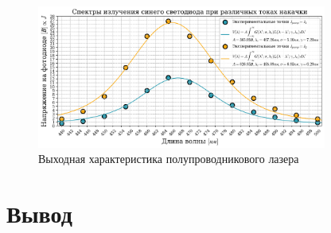 \documentclass[a4paper, 12pt]{extarticle}
\begin{document}
\begin{figure}[htbp]
    \centering
    \includegraphics[width = 0.85\textwidth]{blue.png}
    \caption{Выходная характеристика полупроводникового лазера}
    \label{fig:blue}
\end{figure}






\section*{\textcolor{header}{Вывод}}
\end{document}

